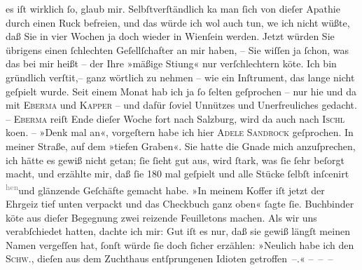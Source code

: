                es iſt wirklich{ }ſo, glaub mir. Selbſtverſtändlich ka{\geminationn}
               man{ }ſich von dieſer Apathie durch einen Ruck befreien, und das würde ich wol auch
               tun, we{\geminationn} ich nicht wüßte, daß Sie in vier Wochen ja doch
               wieder in Wienſein werden. Jetzt würden Sie
               übrigens einen{ }ſchlechten Geſellſchafter an mir haben, – Sie wiſſen ja{ }ſchon, was das
               bei mir heißt – der Ihre »mäßige Sti{\geminationm}ung« nur
               verſchlechtern kö{\geminationn}te. Ich bin gründlich verſti{\geminationm}t,– ganz wörtlich zu nehmen – {\pb}wie ein Inſtrument, das lange nicht
               geſpielt wurde. Seit einem Monat hab ich ja{ }ſo{ }ſelten geſprochen – nur hie und da mit
                  \textsc{Eberma{\geminationn}} und \textsc{Kapper} – und dafür{ }ſoviel Unnützes und Unerfreuliches gedacht. – \textsc{Eberma{\geminationn}} reiſt Ende dieſer Woche fort nach Salzburg,
               wird da{\geminationn} auch nach \textsc{Ischl} ko{\geminationm}en. – »Denk mal an«, vorgeſtern habe ich hier
                  \textsc{Adele Sandrock} geſprochen. In meiner Straße, auf dem »tiefen
                  Graben«. Sie hatte die Gnade mich anzuſprechen, ich hätte es gewiß nicht
               getan;{ }ſie{ }ſieht gut aus, wird{ }ſtark, was{ }ſie{ }ſehr beſorgt macht, {\pb}und erzählte mir, daß{ }ſie 180 mal
               geſpielt und alle Stücke{ }ſelbſt inſcenirt \substVorne{}\textsuperscript{\textcolor{gray}{hen}}\substDazwischen{}und\substHinten{} glänzende Geſchäfte gemacht habe. »In meinem Koffer iſt jetzt der Ehrgeiz
               tief unten verpackt und das Checkbuch ganz oben«{ }ſagte{ }ſie. Buchbinder kö{\geminationn}te aus dieſer
               Begegnung zwei reizende Feuilletons machen. Als wir uns verabſchiedet hatten, dachte
               ich mir: Gut iſt es nur, daß sie gewiß längſt meinen Namen vergeſſen hat,{ }ſonſt würde{ }ſie doch{ }ſicher erzählen: »Neulich habe ich den \textsc{Schw.},
               dieſen aus dem Zuchthaus entſprungenen Idioten getroffen –.« – – –\pend
           
